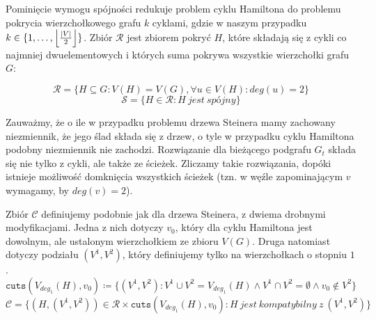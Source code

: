\documentclass[12pt, oneside]{report}
\DeclarePairedDelimiter\floor{\lfloor}{\rfloor}
\begin{document}
Pominięcie wymogu spójności redukuje problem cyklu Hamiltona do problemu pokrycia wierzchołkowego grafu $k$ cyklami, gdzie w naszym przypadku $k \in \{1, \ldots, \floor*{\frac{|V|}{2}}\}$. Zbiór $\mathcal{R}$ jest zbiorem pokryć $H$, które składają się z cykli co najmniej dwuelementowych i których suma pokrywa wszystkie wierzchołki grafu $G$:

$$\mathcal{R} = \{H \subseteq G: V(H) = V(G), \forall u \in V(H): deg(u) = 2\}$$
$$\mathcal{S} = \{H \in \mathcal{R}: H\ jest\ sp\mbox{ó}jny\}$$

Zauważmy, że o ile w przypadku problemu drzewa Steinera mamy zachowany niezmiennik, że jego ślad składa się z drzew, o tyle w przypadku cyklu Hamiltona podobny niezmiennik nie zachodzi. Rozwiązanie dla bieżącego podgrafu $G_t$ składa się nie tylko z cykli, ale także ze ścieżek. Zliczamy takie rozwiązania, dopóki istnieje możliwość domknięcia wszystkich ścieżek (tzn. w węźle zapominającym $v$ wymagamy, by $deg(v) = 2$).

Zbiór $\mathcal{C}$ definiujemy podobnie jak dla drzewa Steinera, z dwiema drobnymi modyfikacjami. Jedna z nich dotyczy $v_0$, który dla cyklu Hamiltona jest dowolnym, ale ustalonym wierzchołkiem ze zbioru $V(G)$. Druga natomiast dotyczy podziału $(V^1, V^2)$, który definiujemy tylko na wierzchołkach o stopniu $1$.
$$\texttt{cuts} (V_{deg_1}(H), v_0) \coloneqq \{(V^1, V^2): V^1 \cup V^2 = V_{deg_1}(H) \wedge V^1 \cap V^2 = \emptyset \wedge v_0 \notin V^2\}$$
$$\mathcal{C} = \{(H, (V^1, V^2)) \in \mathcal{R} \times \texttt{cuts}(V_{deg_1}(H), v_0) : H\ jest\ kompatybilny\ z\ (V^1, V^2)\}$$
\end{document}

